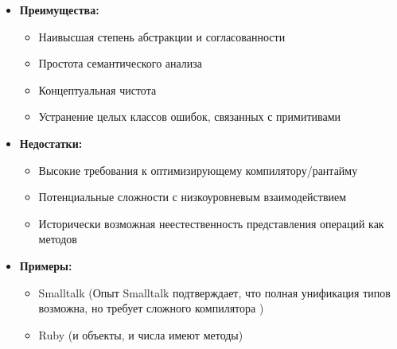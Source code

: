 \begin{itemize}[leftmargin=*, label={--}]
    \item \textbf{Преимущества:}
    \begin{itemize}
        \item Наивысшая степень абстракции и согласованности
        \item Простота семантического анализа
        \item Концептуальная чистота
        \item Устранение целых классов ошибок, связанных с примитивами
    \end{itemize}

    \item \textbf{Недостатки:}
    \begin{itemize}
        \item Высокие требования к оптимизирующему компилятору/рантайму
        \item Потенциальные сложности с низкоуровневым взаимодействием
        \item Исторически возможная неестественность представления операций как методов
    \end{itemize}

    \item \textbf{Примеры:}
    \begin{itemize}
        \item Smalltalk (Опыт Smalltalk подтверждает, что полная унификация типов возможна, но требует сложного компилятора \cite{smith2020})
        \item Ruby (и объекты, и числа имеют методы)
    \end{itemize}
\end{itemize}

\newpage